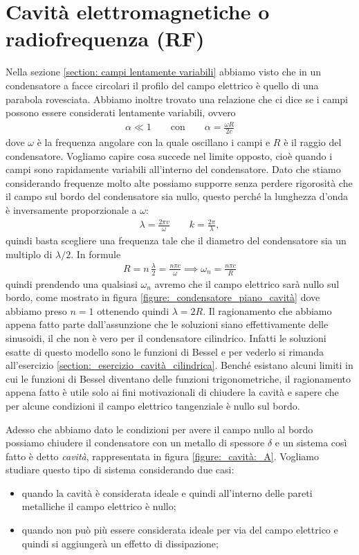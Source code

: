 \section{Cavità elettromagnetiche o radiofrequenza (RF)}
Nella sezione \ref{section: campi lentamente variabili} abbiamo visto che in un condensatore a facce circolari il profilo del campo elettrico è quello di 
una parabola rovesciata. Abbiamo inoltre trovato una relazione che ci dice se i campi possono essere considerati lentamente variabili, ovvero
\begin{align}
  \alpha  \ll 1 \qquad \text{con} \qquad \alpha = \frac{\omega R}{2 c}
\end{align}
dove $ \omega $ è la frequenza angolare con la quale oscillano i campi e $ R $ è il raggio del condensatore.
Vogliamo capire cosa succede nel limite opposto, cioè quando i campi sono rapidamente variabili all'interno del condensatore. Dato che stiamo considerando 
frequenze molto alte possiamo supporre senza perdere rigorosità che il campo sul bordo del condensatore sia nullo, questo perché la lunghezza d'onda è 
inversamente proporzionale a $ \omega $:
\begin{align}
  \lambda = \frac{2\pi v}{\omega} \qquad k = \frac{2\pi}{\lambda},
\end{align}
quindi basta scegliere una frequenza tale che il diametro del condensatore sia un multiplo di $\lambda/2$. In formule
\begin{align}
  R = n \, \frac{\lambda}{2} = \frac{n \pi c}{\omega} \implies \omega_n = \frac{n \pi c}{R}
\end{align}
quindi prendendo una qualsiasi $ \omega_n $ avremo che il campo elettrico sarà nullo sul bordo, come mostrato in figura 
\ref{figure:_condensatore_piano_cavità} dove abbiamo preso 
$ n = 1 $ ottenendo quindi $ \lambda = 2 R $. Il ragionamento che abbiamo appena fatto parte dall'assunzione che le soluzioni siano effettivamente delle 
sinusoidi, il che non è vero per il condensatore cilindrico. Infatti le soluzioni esatte di questo modello sono le funzioni di Bessel e per vederlo si 
rimanda all'esercizio \ref{section:_esercizio_cavità_cilindrica}. Benché esistano alcuni limiti in cui le funzioni di Bessel diventano delle funzioni 
trigonometriche, il ragionamento appena fatto è utile solo ai fini motivazionali di chiudere la cavità e sapere che per alcune condizioni il campo 
elettrico tangenziale è nullo sul bordo.



Adesso che abbiamo dato le condizioni per avere il campo nullo al bordo possiamo chiudere il condensatore con un metallo di spessore $ \delta $ e un 
sistema così fatto è detto \textit{cavità}, rappresentata in figura \ref{figure:_cavità:_A}. Vogliamo studiare questo tipo di sistema considerando due casi: 
\begin{itemize}
  \item quando la cavità è considerata ideale e quindi all'interno delle pareti metalliche il campo elettrico è nullo;
  \item quando non può più essere considerata ideale per via del campo elettrico e quindi si aggiungerà un effetto di dissipazione;
\end{itemize}

